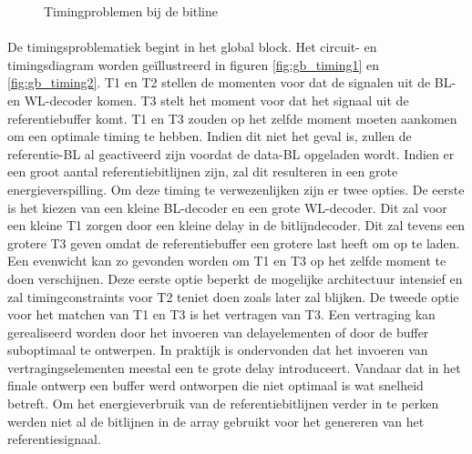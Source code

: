 \begin{figure}[!ht]
\centering
{}
\caption[Timingproblemen bij de bitline]{Timingproblemen bij de bitline}
\end{figure}

\paragraph{}
De timingsproblematiek begint in het global block. Het circuit- en timingsdiagram worden geïllustreerd in figuren \ref{fig:gb_timing1} en \ref{fig:gb_timing2}. T1 en T2 stellen de momenten voor dat de signalen uit de BL- en WL-decoder komen. T3 stelt het moment voor dat het signaal uit de referentiebuffer komt. T1 en T3 zouden op het zelfde moment moeten aankomen om een optimale timing te hebben. Indien dit niet het geval is, zullen de referentie-BL al geactiveerd zijn voordat de data-BL opgeladen wordt. Indien er een groot aantal referentiebitlijnen zijn, zal dit resulteren in een grote energieverspilling. Om deze timing te verwezenlijken zijn er twee opties. De eerste is het kiezen van een kleine BL-decoder en een grote WL-decoder. Dit zal voor een kleine T1 zorgen door een kleine delay in de bitlijndecoder. Dit zal tevens een grotere T3 geven omdat de referentiebuffer een grotere last heeft om op te laden. Een evenwicht kan zo gevonden worden om T1 en T3 op het zelfde moment te doen verschijnen. Deze eerste optie beperkt de mogelijke architectuur intensief en zal timingconstraints voor T2 teniet doen zoals later zal blijken. De tweede optie voor het matchen van T1 en T3 is het vertragen van T3. Een vertraging kan gerealiseerd worden door het invoeren van delayelementen of door de buffer suboptimaal te ontwerpen. In praktijk is ondervonden dat het invoeren van vertragingselementen meestal een te grote delay introduceert. Vandaar dat in het finale ontwerp een buffer werd ontworpen die niet optimaal is wat snelheid betreft. Om het energieverbruik van de referentiebitlijnen verder in te perken werden niet al de bitlijnen in de array gebruikt voor het genereren van het referentiesignaal.


